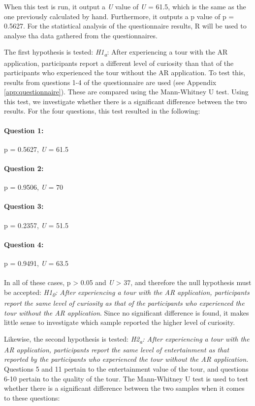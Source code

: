 When this test is run, it output a \textit{U} value of \textit{U} = 61.5, which is the same as the one previously calculated by hand. Furthermore, it outputs a p value of p = 0.5627. For the statistical analysis of the questionnaire results, R will be used to analyse tha data gathered from the questionnaires.
 
The first hypothesis is tested: \textit{H1\textsubscript{a}}: After experiencing a tour with the AR application, participants report a different level of curiosity than that of the participants who experienced the tour without the AR application. To test this, results from questions 1-4 of the questionnaire are used (see Appendix \ref{app:questionnaire}). These are compared using the Mann-Whitney U test. Using this test, we investigate whether there is a significant difference between the two results. For the four questions, this test resulted in the following:

\paragraph{Question 1:} p = 0.5627, \textit{U} = 61.5
\paragraph{Question 2:} p = 0.9506, \textit{U} = 70
\paragraph{Question 3:} p = 0.2357, \textit{U} = 51.5
\paragraph{Question 4:} p = 0.9491, \textit{U} = 63.5\\
\\
In all of these cases, p > 0.05 and \textit{U} > 37, and therefore the null hypothesis must be accepted: \textit{H1\textsubscript{0}: After experiencing a tour with the AR application, participants report the same level of curiosity as that of the participants who experienced the tour without the AR application}. Since no significant difference is found, it makes little sense to investigate which sample reported the higher level of curiosity.

Likewise, the second hypothesis is tested: \textit{H2\textsubscript{a}: After experiencing a tour with the AR application, participants report the same level of entertainment as that reported by the participants who experienced the tour without the AR application.} Questions 5 and 11 pertain to the entertainment value of the tour, and questions 6-10 pertain to the quality of the tour. The Mann-Whitney U test is used to test whether there is a significant difference between the two samples when it comes to these questions:


